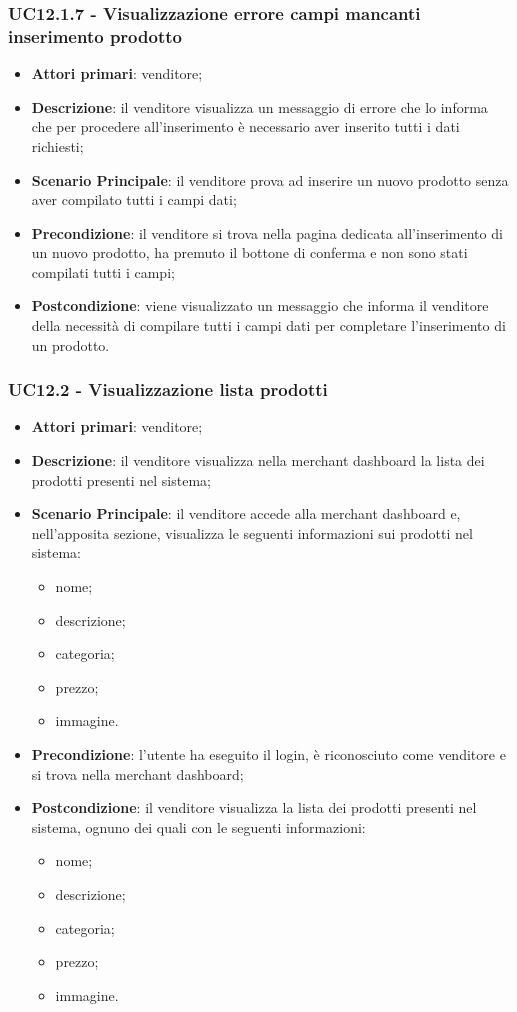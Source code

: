 \subsubsection{UC12.1.7 - Visualizzazione errore campi mancanti inserimento prodotto}
\begin{itemize}
\item \textbf{Attori primari}: venditore;
\item \textbf{Descrizione}: il venditore visualizza un messaggio di errore che lo informa che per procedere all'inserimento è necessario aver inserito tutti i dati richiesti;
\item \textbf{Scenario Principale}: il venditore prova ad inserire un nuovo prodotto senza aver compilato tutti i campi dati;
\item \textbf{Precondizione}: il venditore si trova nella pagina dedicata all'inserimento di un nuovo prodotto, ha premuto il bottone di conferma e non sono stati compilati tutti i campi;
\item \textbf{Postcondizione}: viene visualizzato un messaggio che informa il venditore della necessità di compilare tutti i campi dati per completare l'inserimento di un prodotto.
\end{itemize}

\subsubsection{UC12.2 - Visualizzazione lista prodotti}
\begin{itemize}
\item \textbf{Attori primari}: venditore;
\item \textbf{Descrizione}: il venditore visualizza nella merchant dashboard la lista dei prodotti presenti nel sistema;
\item \textbf{Scenario Principale}: il venditore accede alla merchant dashboard e, nell'apposita sezione, visualizza le seguenti informazioni sui prodotti nel sistema:
\begin{itemize}
\item nome;
\item descrizione;
\item categoria;
\item prezzo;
\item immagine.
\end{itemize}
\item \textbf{Precondizione}: l'utente ha eseguito il login, è riconosciuto come venditore e si trova nella merchant dashboard;
\item \textbf{Postcondizione}: il venditore visualizza la lista dei prodotti presenti nel sistema, ognuno dei quali con le seguenti informazioni:
\begin{itemize}
\item nome;
\item descrizione;
\item categoria;
\item prezzo;
\item immagine.
\end{itemize}
\end{itemize}

